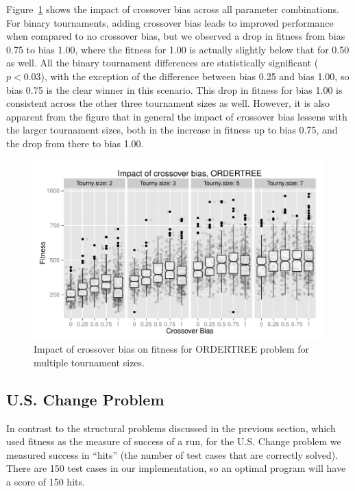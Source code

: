\documentclass{sig-alternate}
\begin{document}
Figure~\ref{fig:Ordertree_results_all_tournaments_Jan15} shows the impact of crossover bias across all parameter 
combinations. 
For binary tournaments, adding crossover bias leads to improved performance when compared to no crossover bias,
but we observed a drop in fitness from bias 0.75 to
bias 1.00, where the fitness for 1.00 is actually slightly below that for 0.50 as well. All the binary tournament 
differences are
statistically significant ($p < 0.03$), with the exception of the difference between bias 0.25 and bias 1.00, so bias
0.75 is the clear winner in this scenario. This drop in fitness for bias 1.00 is consistent across the other three
tournament sizes as well. However, it is also apparent from the figure that in general the impact of crossover bias
lessens with the larger tournament sizes, both in the increase in fitness up to bias 0.75, and the drop from there to
bias 1.00.

\begin{figure}
\centering
\includegraphics[width=0.45 \textwidth]{Plots/Ordertree_results_all_tournaments_Jan15.pdf}
\caption{Impact of crossover bias on fitness for \mbox{ORDERTREE} problem for multiple tournament sizes.}
\label{fig:Ordertree_results_all_tournaments_Jan15}
\end{figure}

%
%
%
%

\subsection{U.S. Change Problem} \label{sec:USChange}

In contrast to the structural problems discussed in the previous section, which used fitness as the measure of success
of a run, for the U.S. Change problem we measured success in ``hits'' (the number of test cases that are correctly
solved). There are 150 test cases in our implementation, so an optimal program will have a score of 150 hits.
\end{document}
